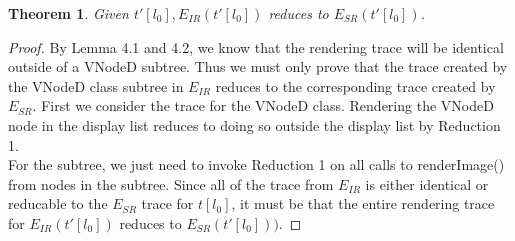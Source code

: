 \documentclass[11pt]{article}
\newtheorem{theorem}{Theorem}[section]
\newtheorem{lemma}[theorem]{Lemma}
\begin{document}

\begin{theorem} Given $t'[l_0], E_{IR}(t'[l_0])$ reduces to $E_{SR}(t'[l_0])$. \end{theorem}
\begin{proof}
By Lemma 4.1 and 4.2, we know that the rendering trace will be identical outside of a VNodeD subtree. Thus we must only prove that the trace created by the VNodeD class subtree in $E_{IR}$ reduces to the corresponding trace created by $E_{SR}$.
First we consider the trace for the VNodeD class. Rendering the VNodeD node in the display list reduces to doing so outside the display list by Reduction 1.\\
For the subtree, we just need to invoke Reduction 1 on all calls to renderImage() from nodes in the subtree.
Since all of the trace from $E_{IR}$ is either identical or reducable to the $E_{SR}$ trace for $t[l_0]$, it must be that the entire rendering trace for $E_{IR}(t'[l_0])$ reduces to $E_{SR}(t'[l_0]))$. 
\end{proof}
\end{document}
